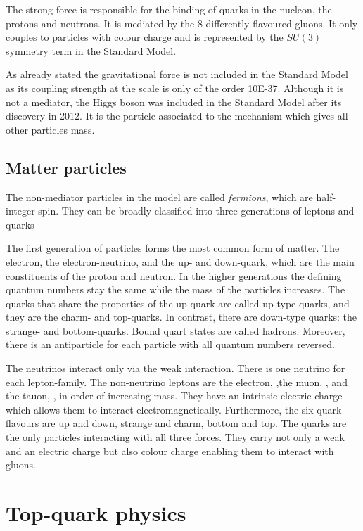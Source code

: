 The strong force is responsible for the binding of quarks in the nucleon, the protons and neutrons. It is mediated by the \num{8} differently flavoured gluons. It only couples to particles with colour charge and is represented by the $SU(3)$ symmetry term in the Standard Model.

As already stated the gravitational force is not included in the Standard Model as its coupling strength at the scale is only of the order \num{10E-37}. Although it is not a mediator, the Higgs boson was included in the Standard Model after its discovery in 2012. It is the particle associated to the mechanism which gives all other particles mass.

\subsection{Matter particles}

The non-mediator particles in the model are called \emph{fermions}, which are half-integer spin. They can be broadly classified into three generations of leptons and quarks

The first generation of particles forms the most common form of matter. The electron, the electron-neutrino, and the up- and down-quark, which are the main constituents of the proton and neutron.
In the higher generations the defining quantum numbers stay the same while the mass of the particles increases.
The quarks that share the properties of the up-quark are called up-type quarks, and they are the charm- and top-quarks. In contrast, there are down-type quarks: the strange- and bottom-quarks. Bound quart states are called hadrons.
Moreover, there is an antiparticle for each particle with all quantum numbers reversed.

The neutrinos interact only via the weak interaction. There is one neutrino for each lepton-family.
The non-neutrino leptons are the electron, \Pelectron,the muon, \Pmu , and the tauon, \Ptau, in order of increasing mass. They have an intrinsic electric charge which allows them to interact electromagnetically.
Furthermore, the six quark flavours are up and down, strange and charm, bottom and top.
The quarks are the only particles interacting with all three forces. They carry not only a weak and an electric charge but also colour charge enabling them to interact with gluons.

\section{Top-quark physics}


